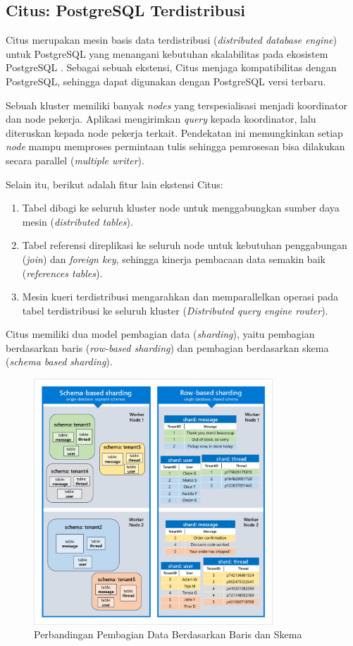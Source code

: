 \subsection{Citus: PostgreSQL Terdistribusi}

Citus merupakan mesin basis data terdistribusi (\textit{distributed database engine}) untuk PostgreSQL yang menangani kebutuhan skalabilitas pada ekosistem PostgreSQL \parencite{citus}. Sebagai sebuah ekstensi, Citus menjaga kompatibilitas dengan PostgreSQL, sehingga dapat digunakan dengan PostgreSQL versi terbaru.

Sebuah kluster memiliki banyak \textit{nodes} yang terspesialisasi menjadi koordinator dan node pekerja. Aplikasi mengirimkan \textit{query} kepada koordinator, lalu diteruskan kepada node pekerja terkait. Pendekatan ini memungkinkan setiap \textit{node} mampu memproses permintaan tulis sehingga pemrosesan bisa dilakukan secara parallel (\textit{multiple writer}).

Selain itu, berikut adalah fitur lain ekstensi Citus:

\begin{enumerate}
    \item Tabel dibagi ke seluruh kluster node untuk menggabungkan sumber daya mesin (\textit{distributed tables}).
    \item Tabel referensi direplikasi ke seluruh node untuk kebutuhan penggabungan (\textit{join}) dan \textit{foreign key}, sehingga kinerja pembacaan data semakin baik (\textit{references tables}).
    \item Mesin kueri terdistribusi mengarahkan dan memparallelkan operasi pada tabel terdistribusi ke seluruh kluster (\textit{Distributed query engine router}).
\end{enumerate}

Citus memiliki dua model pembagian data (\textit{sharding}), yaitu pembagian berdasarkan baris (\textit{row-based sharding}) dan pembagian berdasarkan skema (\textit{schema based sharding}).

\begin{figure}[htbp]
    \centering
    \includegraphics[width=0.8\textwidth]{resources/chapter-2/row-vs-schema-sharding.png}
    \caption{Perbandingan Pembagian Data Berdasarkan Baris dan Skema \parencite{schemaBasedSharding}}
    \label{fig:row-vs-schema-sharding}
\end{figure}

